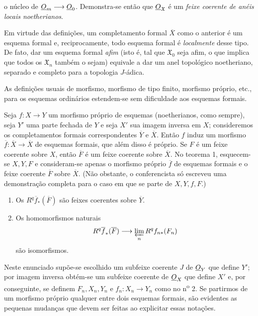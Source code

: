 o núcleo de $\underline{O}_m\longrightarrow\underline{O}_0$. Demonstra-se então que
$\underline{O}_{\mathfrak X}$ é um \emph{feixe coerente de anéis locais
noetherianos}.

Em virtude das definições, um completamento formal $\overline X$ como o
anterior é um esquema formal e, reciprocamente, todo esquema formal é
\emph{localmente} desse tipo. De fato, dar um esquema formal \emph{afim} (isto
é, tal que $\mathfrak X_0$ seja afim, o que implica que todos os
$\mathfrak X_n$ também o sejam) equivale a dar um anel topológico noetheriano,
separado e completo para a topologia $J$-ádica.

As definições usuais de morfismo, morfismo de tipo finito, morfismo
próprio, etc., para os esquemas ordinários estendem-se sem dificuldade aos
esquemas formais.


Seja $f:X\longrightarrow Y$ um morfismo próprio de esquemas (noetherianos, como
sempre), seja $Y'$ uma parte fechada de $Y$ e seja $X'$ sua imagem inversa em
$X$; consideremos os completamentos formais correspondentes $\overline Y$ e
$\overline X$. Então $f$ induz um morfismo
$\overline f:\overline X\longrightarrow\overline X$ de esquemas formais, que
além disso é próprio. Se $F$ é um feixe coerente sobre $X$, então $\overline F$
é um feixe coerente sobre $\overline X$. No teorema 1, esquecem-se $X,Y,F$ e
consideram-se apenas o morfismo próprio $\overline f$ de esquemas formais e o
feixe coerente $\overline F$ sobre $\overline X$. (Não obstante, o conferencista
só escreveu uma demonstração completa para o caso em que se parte de
$X,Y,f,F$.)

\begin{enumerate}
  \item[\textit{i.}] Os $R^{q}\overline f_{*}(\overline F)$ são feixes
    coerentes sobre $\overline Y$.
  \item[\textit{ii.}] Os homomorfismos naturais
    \[
      R^{q}\overline f_{*}(\overline F)
      \longrightarrow \varprojlim_n R^{q}f_{n*}(F_n)
    \]
    são isomorfismos.
\end{enumerate}

Neste enunciado supõe-se escolhido um subfeixe coerente $J$ de $\underline{O}_Y$ que
define $Y'$; por imagem inversa obtém-se um subfeixe coerente de $\underline{O}_X$ que
define $X'$ e, por conseguinte, se definem $F_n,X_n,Y_n$ e
$f_n:X_n\longrightarrow Y_n$ como no n\textsuperscript{o} 2. Se partirmos de
um morfismo próprio qualquer entre dois esquemas formais, são evidentes as
pequenas mudanças que devem ser feitas ao explicitar essas notações.

